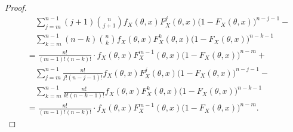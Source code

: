 \begin{proof}
{\begin{equation*}
\begin{split}
&\quad \sum_{j=m}^{n-1} (j+1)\binom{n}{j+1} f_{X}(\theta,x) F_X^{j}(\theta,x) \big(1-F_X(\theta,x)\big)^{n-j-1}- \\
& \quad \sum_{k=m}^{n-1} (n-k)\binom{n}{k} f_{X}(\theta,x) F_X^{k}(\theta,x)\big(1-F_X(\theta,x)\big)^{n-k-1} \\
&=\frac{n!}{(m-1)!(n-k)!}\cdot f_{X}(\theta,x)F_X^{m-1}(\theta,x) \big(1-F_X(\theta,x)\big)^{n-m} + \\
&\quad \sum_{j=m}^{n-1} \frac{n!}{j!(n-j-1)!} f_{X}(\theta,x) F_X^{j}(\theta,x) \big(1-F_X(\theta,x)\big)^{n-j-1}- \\
& \quad \sum_{k=m}^{n-1} \frac{n!}{k!(n-k-1)!} f_{X}(\theta,x) F_X^{k}(\theta,x)\big(1-F_X(\theta,x)\big)^{n-k-1} \\
&=\frac{n!}{(m-1)!(n-k)!}\cdot f_{X}(\theta,x)F_X^{m-1}(\theta,x) \big(1-F_X(\theta,x)\big)^{n-m}.
\end{split}\end{equation*}
}
\end{proof}

